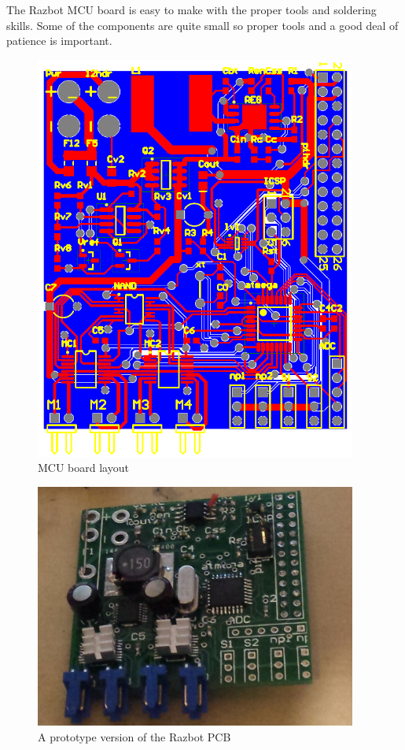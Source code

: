 \documentclass[12pt,titlepage,oneside]{memoir}
\begin{document}
The Razbot MCU board is easy to make with the proper tools and soldering skills. Some of the components are quite small so proper tools and a good deal of patience is important.
\begin{figure}
\includegraphics[width=400px]{picture/mcu.png}
\caption{MCU board layout}
\end{figure}
\begin{figure}
\includegraphics[width=400px]{picture/piboard.jpg}
\caption{A prototype version of the Razbot PCB}
\label{figure:pcbv1}
\end{figure}
\end{document}
